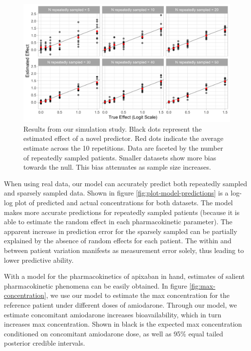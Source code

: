 \begin{figure}
	
	{\centering \includegraphics[width=\linewidth]{figures/simulation-results-1} 
		
	}
	
	\caption{Results from our simulation study.  Black dots represent the estimated effect of a novel predictor.  Red dots indicate the average estimate across the 10 repetitions. Data are faceted by the number of repeatedly sampled patients.  Smaller datasets show more bias towards the null.  This bias attenuates as sample size increases.}\label{fig:simulation-results}
\end{figure}


When using real data, our model can accurately predict both repeatedly
sampled and sparsely sampled data. Shown in figure
\ref{fig:plot-model-predictions} is a log-log plot of predicted and
actual concentrations for both datasets. The model makes more accurate
predictions for repeatedly sampled patients (because it is able to
estimate the random effect in each pharmacokinetic parameter). The
apparent increase in prediction error for the sparsely sampled can be partially
explained by the absence of random effects for each patient. The within
and between patient variation manifests as measurement error solely,
thus leading to lower predictive ability.

With a model for the pharmacokinetics of apixaban in hand, estimates of
salient pharmacokinetic phenomena can be easily obtained. In figure
\ref{fig:max-concentration}, we use our model to estimate the max
concentration for the reference patient under different doses of
amiodarone. Through our model, we estimate concomitant amiodarone
increases bioavailability, which in turn increases max concentration.
Shown in black is the expected max concentration conditioned on
concomitant amiodarone dose, as well as 95\% equal tailed posterior
credible intervals.

